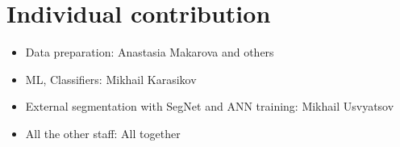 \documentclass{article}
\begin{document}
\section{Individual contribution} 
\begin{itemize} 
\item Data preparation: Anastasia Makarova and others 
\item ML, Classifiers: Mikhail Karasikov 
\item External segmentation with SegNet and ANN training: Mikhail Usvyatsov 
\item All the other staff: All together
\end{itemize}


    
    
    
    
\end{document}
